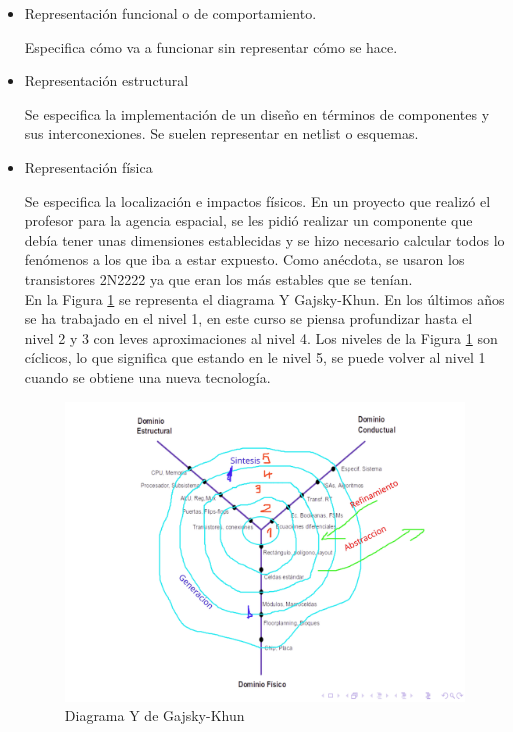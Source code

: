 \documentclass[12pt,letterpaper]{book}
\begin{document}
\begin{itemize}

\item Representación funcional o de comportamiento.

Especifica cómo va a funcionar sin representar cómo se hace.

\item Representación estructural 

Se especifica la implementación de un diseño en términos de componentes y sus interconexiones. Se suelen representar en netlist o esquemas.

\item Representación física

Se especifica la localización e impactos físicos. En un proyecto que realizó el profesor para la agencia espacial, se les pidió realizar un componente que debía tener unas dimensiones establecidas y se hizo necesario calcular todos lo fenómenos a los que iba a estar expuesto. Como anécdota, se usaron los transistores 2N2222 ya que eran los más estables que se tenían.\\

En la Figura \ref{diagramaY} se representa el diagrama Y Gajsky-Khun. En los últimos años se ha trabajado en el nivel 1, en este curso se piensa profundizar hasta el nivel 2 y 3 con leves aproximaciones al nivel 4. Los niveles de la Figura \ref{diagramaY} son cíclicos, lo que significa que estando en le nivel 5, se puede volver al nivel 1 cuando se obtiene una nueva tecnología.

\begin{figure}[H]
\centering
\includegraphics[width=1\textwidth]{figures/diagramaY.png}
\caption{Diagrama Y de Gajsky-Khun}
\label{diagramaY}
\end{figure}


\end{itemize}
\end{document}
